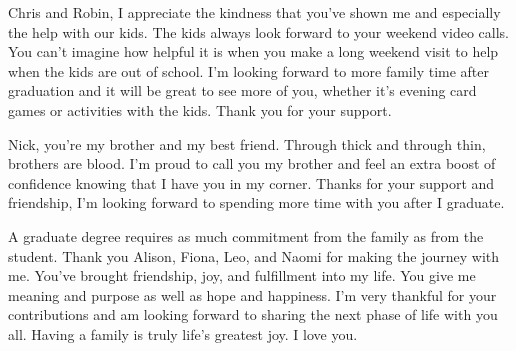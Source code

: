 \begin{acknowledgements}
Chris and Robin, I appreciate the kindness that you've shown me and especially the help with our kids.
The kids always look forward to your weekend video calls.  You can't imagine how helpful it is when you make a long weekend visit to help when the kids are out of school.
I'm looking forward to more family time after graduation and it will be great to see more of you, whether it's evening card games or activities with the kids.
Thank you for your support.

Nick, you're my brother and my best friend.
Through thick and through thin, brothers are blood.
I'm proud to call you my brother and feel an extra boost of confidence knowing that I have you in my corner.
Thanks for your support and friendship, I'm looking forward to spending more time with you after I graduate.

A graduate degree requires as much commitment from the family as from the student.
Thank you Alison, Fiona, Leo, and Naomi for making the journey with me.
You've brought friendship, joy, and fulfillment into my life.
You give me meaning and purpose as well as hope and happiness.
I'm very thankful for your contributions and am looking forward to sharing the next phase of life with you all.
Having a family is truly life's greatest joy.
I love you.

\end{acknowledgements}
